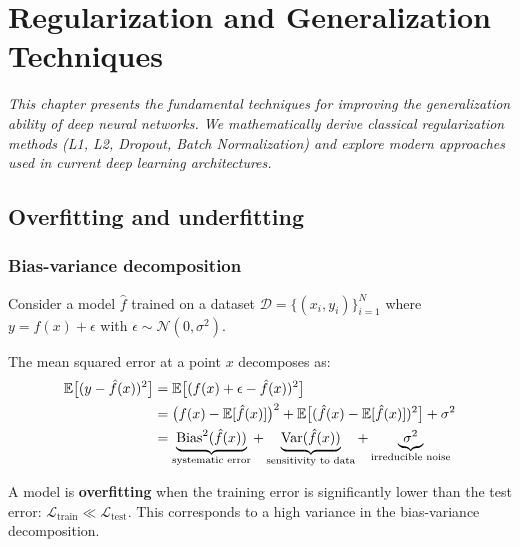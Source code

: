 \chapter{Regularization and Generalization Techniques}
\label{ch:regularization}

\noindent\textit{This chapter presents the fundamental techniques for improving the
generalization ability of deep neural networks. We mathematically
derive classical regularization methods (L1, L2, Dropout, Batch
Normalization) and explore modern approaches used in current deep learning
architectures.}\medskip

\section{Overfitting and underfitting}
\label{sec:overfitting-underfitting}

\subsection{Bias-variance decomposition}

Consider a model $\hat{f}$ trained on a dataset
$\mathcal{D} = \{(x_i, y_i)\}_{i=1}^N$ where $y = f(x) + \epsilon$ with
$\epsilon \sim \mathcal{N}(0, \sigma^2)$.

\begin{mathbox}[title=\textbf{Bias-variance decomposition}]
The mean squared error at a point $x$ decomposes as:
\begin{align}
\mathbb{E}\bigl[(y - \hat{f}(x))^2\bigr]
&= \mathbb{E}\bigl[(f(x) + \epsilon - \hat{f}(x))^2\bigr] \nonumber \\
&= \bigl(f(x) - \mathbb{E}[\hat{f}(x)]\bigr)^2
   + \mathbb{E}\bigl[(\hat{f}(x) - \mathbb{E}[\hat{f}(x)])^2\bigr]
   + \sigma^2 \nonumber \\
&= \underbrace{\text{Bias}^2(\hat{f}(x))}_{\text{systematic error}}
   + \underbrace{\mathrm{Var}(\hat{f}(x))}_{\text{sensitivity to data}}
   + \underbrace{\sigma^2}_{\text{irreducible noise}}
\label{eq:bias-variance}
\end{align}
\end{mathbox}

\begin{definition}[Overfitting]
A model is \textbf{overfitting} when the training error is significantly
lower than the test error:
$\mathcal{L}_{\text{train}} \ll \mathcal{L}_{\text{test}}$. This corresponds
to a high variance in the bias-variance decomposition.
\end{definition}

